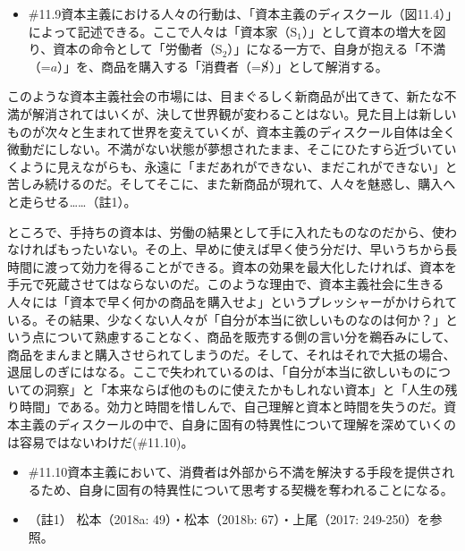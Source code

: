 \begin{note}{}
  \begin{itemize}
    \tightlist
    \item{\#11.9}資本主義における人々の行動は、「資本主義のディスクール（図11.4）」によって記述できる。ここで人々は「資本家（$\textrm{S}_1$）」として資本の増大を図り、資本の命令として「労働者（$\textrm{S}_2$）」になる一方で、自身が抱える「不満（=$a$）」を、商品を購入する「消費者（=$\cancel{\textrm{S}}$）」として解消する。
  \end{itemize}
\end{note}

このような資本主義社会の市場には、目まぐるしく新商品が出てきて、新たな不満が解消されてはいくが、決して世界観が変わることはない。見た目上は新しいものが次々と生まれて世界を変えていくが、資本主義のディスクール自体は全く微動だにしない。不満がない状態が夢想されたまま、そこにひたすら近づいていくように見えながらも、永遠に「まだあれができない、まだこれができない」と苦しみ続けるのだ。そしてそこに、また新商品が現れて、人々を魅惑し、購入へと走らせる\ldots\ldots（註1）。

ところで、手持ちの資本は、労働の結果として手に入れたものなのだから、使わなければもったいない。その上、早めに使えば早く使う分だけ、早いうちから長時間に渡って効力を得ることができる。資本の効果を最大化したければ、資本を手元で死蔵させてはならないのだ。このような理由で、資本主義社会に生きる人々には「資本で早く何かの商品を購入せよ」というプレッシャーがかけられている。その結果、少なくない人々が「自分が本当に欲しいものなのは何か？」という点について熟慮することなく、商品を販売する側の言い分を鵜呑みにして、商品をまんまと購入させられてしまうのだ。そして、それはそれで大抵の場合、退屈しのぎにはなる。ここで失われているのは、「自分が本当に欲しいものについての洞察」と「本来ならば他のものに使えたかもしれない資本」と「人生の残り時間」である。効力と時間を惜しんで、自己理解と資本と時間を失うのだ。資本主義のディスクールの中で、自身に固有の特異性について理解を深めていくのは容易ではないわけだ(\#11.10)。

\begin{note}{}
  \begin{itemize}
    \tightlist
    \item{\#11.10}資本主義において、消費者は外部から不満を解決する手段を提供されるため、自身に固有の特異性について思考する契機を奪われることになる。
  \end{itemize}
\end{note}

\begin{itemize}
\tightlist
\item
  （註1） 松本（2018a: 49）\cite{Matsumoto1}・松本（2018b:
  67）\cite{Matsumoto2}・上尾（2017: 249-250）\cite{Ueo}を参照。
\end{itemize}

